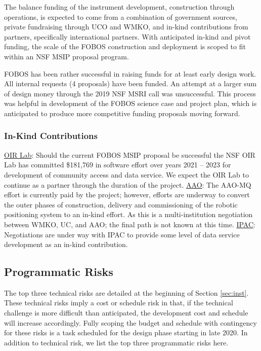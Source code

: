 \documentclass[oneside,11pt]{amsart}
\begin{document}
The balance funding of the instrument development, construction
through operations, is expected to come from a combination of
government sources, private fundraising through UCO and WMKO, and
in-kind contributions from partners, specifically international
partners. With anticipated in-kind and pivot funding, the scale of
the FOBOS construction and deployment is scoped to fit within an NSF
MSIP proposal program.

FOBOS has been rather successful in raising funds for at least early
design work. All internal requests (4 proposals) have been funded. An
attempt at a larger sum of design money through the 2019 NSF MSRI
call was unsuccessful. This process was helpful in development of the
FOBOS science case and project plan, which is anticipated to produce
more competitive funding proposals moving forward.

\subsubsection{In-Kind Contributions}

\underline{OIR Lab}: Should the current FOBOS MSIP proposal be
successful the NSF OIR Lab has committed \$181,769 in software effort
over years 2021 – 2023 for development of community access and data
service. We expect the OIR Lab to continue as a partner through the
duration of the project. \underline{AAO}: The AAO-MQ effort is
currently paid by the project; however, efforts are underway to
convert the outer phases of construction, delivery and commissioning
of the robotic positioning system to an in-kind effort. As this is a
multi-institution negotiation between WMKO, UC, and AAO; the final
path is not known at this time. \underline{IPAC}: Negotiations are
under way with IPAC to provide some level of data service development
as an in-kind contribution.


\subsection{Programmatic Risks}

The top three technical risks are detailed at the beginning of
Section \ref{sec:inst}. These technical risks imply a cost or
schedule risk in that, if the technical challenge is more difficult than
anticipated, the development cost and schedule will increase
accordingly. Fully scoping the budget and schedule with contingency for these
risks is a task scheduled for the design phase starting in late 2020.
In addition to technical risk, we list the top three programmatic risks here.
\end{document}
